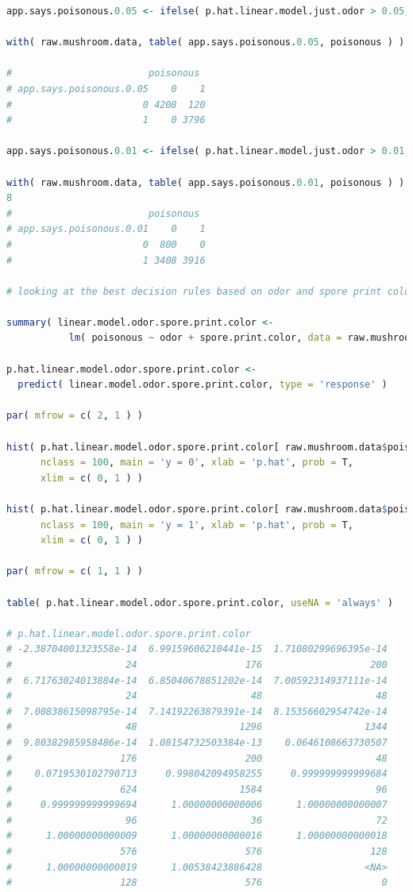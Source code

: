 \documentclass[12pt]{article}
\begin{document}
\begin{lstlisting}[language = R]
app.says.poisonous.0.05 <- ifelse( p.hat.linear.model.just.odor > 0.05, 1, 0 )

with( raw.mushroom.data, table( app.says.poisonous.0.05, poisonous ) )

#                        poisonous
# app.says.poisonous.0.05    0    1
#                       0 4208  120
#                       1    0 3796

app.says.poisonous.0.01 <- ifelse( p.hat.linear.model.just.odor > 0.01, 1, 0 )

with( raw.mushroom.data, table( app.says.poisonous.0.01, poisonous ) )
8
#                        poisonous
# app.says.poisonous.0.01    0    1
#                       0  800    0
#                       1 3408 3916

# looking at the best decision rules based on odor and spore print color:

summary( linear.model.odor.spore.print.color <- 
           lm( poisonous ~ odor + spore.print.color, data = raw.mushroom.data ) )

p.hat.linear.model.odor.spore.print.color <- 
  predict( linear.model.odor.spore.print.color, type = 'response' )

par( mfrow = c( 2, 1 ) )

hist( p.hat.linear.model.odor.spore.print.color[ raw.mushroom.data$poisonous == 0 ],
      nclass = 100, main = 'y = 0', xlab = 'p.hat', prob = T,
      xlim = c( 0, 1 ) )

hist( p.hat.linear.model.odor.spore.print.color[ raw.mushroom.data$poisonous == 1 ],
      nclass = 100, main = 'y = 1', xlab = 'p.hat', prob = T,
      xlim = c( 0, 1 ) )

par( mfrow = c( 1, 1 ) )

table( p.hat.linear.model.odor.spore.print.color, useNA = 'always' )

# p.hat.linear.model.odor.spore.print.color
# -2.38704001323558e-14  6.99159606210441e-15  1.71080299696395e-14 
#                    24                   176                   200 
#  6.71763024013884e-14  6.85040678851202e-14  7.00592314937111e-14 
#                    24                    48                    48 
#  7.00838615098795e-14  7.14192263879391e-14  8.15356602954742e-14 
#                    48                  1296                  1344 
#  9.80382985958486e-14  1.08154732503384e-13    0.0646108663730507 
#                   176                   200                    48 
#    0.0719530102790713     0.998042094958255     0.999999999999684 
#                   624                  1584                    96 
#     0.999999999999694      1.00000000000006      1.00000000000007 
#                    96                    36                    72 
#      1.00000000000009      1.00000000000016      1.00000000000018 
#                   576                   576                   128 
#      1.00000000000019      1.00538423886428                  <NA> 
#                   128                   576                     0


\end{lstlisting}
\end{document}
